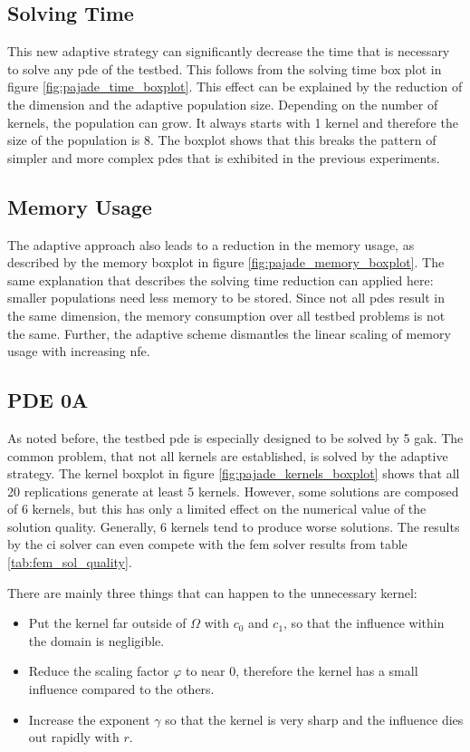 \documentclass[./\jobname.tex]{subfiles}
\begin{document}
\subsection{Solving Time}

This new adaptive strategy can significantly decrease the time that is necessary to solve any \gls{pde} of the testbed. This follows from the solving time box plot in figure \ref{fig:pajade_time_boxplot}. This effect can be explained by the reduction of the dimension and the adaptive population size. Depending on the number of kernels, the population can grow. It always starts with 1 kernel and therefore the size of the population is 8. The boxplot shows that this breaks the pattern of simpler and more complex \gls{pde}s that is exhibited in the previous experiments.

\subsection{Memory Usage}
The adaptive approach also leads to a reduction in the memory usage, as described by the memory boxplot in figure \ref{fig:pajade_memory_boxplot}. The same explanation that describes the solving time reduction can applied here: smaller populations need less memory to be stored. Since not all \gls{pde}s result in the same dimension, the memory consumption over all testbed problems is not the same. Further, the adaptive scheme dismantles the linear scaling of memory usage with increasing \gls{nfe}. 

\subsection{PDE 0A}
\label{chap:ex2_discussion_pde0a}
As noted before, the testbed \gls{pde} is especially designed to be solved by 5 \gls{gak}. The common problem, that not all kernels are established, is solved by the adaptive strategy. The kernel boxplot in figure \ref{fig:pajade_kernels_boxplot} shows that all 20 replications generate at least 5 kernels. However, some solutions are composed of 6 kernels, but this has only a limited effect on the numerical value of the solution quality. Generally, 6 kernels tend to produce worse solutions. The results by the \gls{ci} solver can even compete with the \gls{fem} solver results from table \ref{tab:fem_sol_quality}.

There are mainly three things that can happen to the unnecessary kernel: 
\begin{itemize}
	\item Put the kernel far outside of $\Omega$ with $c_0$ and $c_1$, so that the influence within the domain is negligible.
	\item Reduce the scaling factor $\varphi$ to near 0, therefore the kernel has a small influence compared to the others.
	\item Increase the exponent $\gamma$ so that the kernel is very sharp and the influence dies out rapidly with $r$.
\end{itemize}
\end{document}
